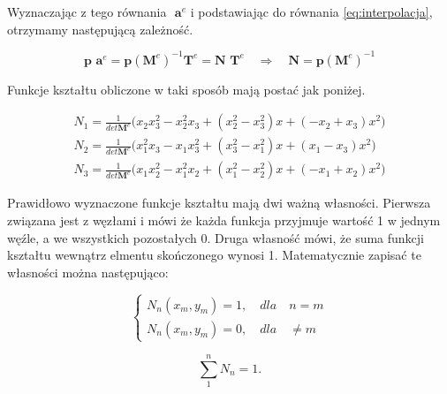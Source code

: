 Wyznaczając z tego równania \( \textbf{ a}^e  \) i podstawiając do równania \ref{eq:interpolacja}, otrzymamy następującą zależność.

\begin{equation}
\textbf{p a}^e = \textbf{p} {(\textbf{M}^e)}^{-1} \textbf{T}^e  = \textbf{N T}^e   \quad \Rightarrow \quad \textbf{N} = \textbf{p} {(\textbf{M}^e)}^{-1}
\end{equation}

Funkcje kształtu obliczone w taki sposób mają postać jak poniżej.

\begin{equation}
\begin{aligned}
N_1 = \frac{1}{det\textbf{M}^e} \big(x_2 x_3^2 - x_2^2 x_3 + (x_2^2 - x_3^2)x + (-x_2 + x_3)x^2\big) \\
N_2 = \frac{1}{det\textbf{M}^e} \big(x_1^2 x_3 - x_1 x_3^2 + (x_3^2 - x_1^2)x + (x_1 - x_3)x^2\big) \\
N_3 = \frac{1}{det\textbf{M}^e} \big(x_1 x_2^2 - x_1^2 x_2 + (x_1^2 - x_2^2)x + (-x_1 + x_2)x^2\big)
\end{aligned}
\end{equation}

Prawidłowo wyznaczone funkcje kształtu mają dwi ważną własności. Pierwsza związana jest z węzłami i mówi że każda funkcja przyjmuje wartość 1 w jednym węźle, a we wszystkich pozostałych 0. Druga własność mówi, że suma funkcji kształtu wewnątrz elmentu skończonego wynosi 1. Matematycznie zapisać te własności można następująco:

 \begin{equation} \label{eq:eq_zgodnosc}
	\left\{
                \begin{array}{ll}
		N_n(x_m, y_m) = 1, \quad dla \quad n=m \\
		N_n(x_m, y_m) = 0, \quad dla \quad \neq m 
                \end{array}
	\right.
 \end{equation}

 \begin{equation} \label{eq:WBS}
	\sum_1^n N_n = 1.
 \end{equation}























